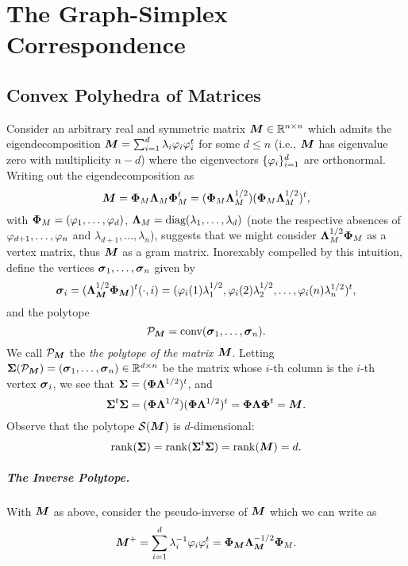 \chapter{The Graph-Simplex Correspondence}



\section{Convex Polyhedra of Matrices}
Consider an arbitrary real and symmetric matrix ${\vb*{M}}\in \mathbb{R}^{n\times n}$ which admits the eigendecomposition ${\vb*{M}}=\sum_{i=1}^d \lambda_i \varphi_i\varphi_i^t$ for some $d\leq n$ (i.e., ${\vb*{M}}$ has eigenvalue zero with multiplicity $n-d$) where the eigenvectors $\{\varphi_i\}_{i=1}^d $ are orthonormal. Writing out the eigendecomposition as 
\[{\vb*{M}}=\boldsymbol{\Phi}_M\vb{\Lambda}_M\boldsymbol{\Phi}_M^t=(\boldsymbol{\Phi}_M\vb{\Lambda}_M^{1/2})(\boldsymbol{\Phi}_M\vb{\Lambda}_M^{1/2})^t,\]
with $\boldsymbol{\Phi}_M = (\varphi_1,\dots,\varphi_d)$, $\vb{\Lambda}_M=\text{diag}(\lambda_1,\dots,\lambda_d)$ (note the respective absences of $\varphi_{d+1},\dots,\varphi_n$ and $\lambda_{d+1},\dots,\lambda_n$), suggests that we might consider $\vb{\Lambda}_M^{1/2}\boldsymbol{\Phi}_M$ as a vertex matrix, thus ${\vb*{M}}$ as a gram matrix. 
Inorexably compelled by this intuition, define the vertices $\vb*{\sigma}_1,\dots,\vb*{\sigma}_n$ given by 
\begin{equation*}
    \vb*{\sigma}_i = (\vb{\Lambda}_{\vb*{M}}^{1/2}\boldsymbol{\Phi}_{\vb*{M}})^t (\cdot,i) = (\varphi_i(1)\lambda_1^{1/2}, \varphi_i(2)\lambda_2^{1/2},\dots,\varphi_i(n)\lambda_n^{1/2})^t,
\end{equation*}
and the polytope 
\begin{equation*}
\mathcal{P}_{\vb*{M}}=\textnormal{conv}(\vb*{\sigma}_1,\dots,\vb*{\sigma}_n).
\end{equation*}
We call $\mathcal{P}_{\vb*{M}}$ the \emph{the polytope of the matrix ${\vb*{M}}$}. 
Letting $\boldsymbol{\Sigma}(\mathcal{P}_{\vb*{M}})=(\vb*{\sigma}_1,\dots,\vb*{\sigma}_n)\in \mathbb{R}^{d\times n}$ be the matrix whose $i$-th column is the $i$-th vertex $\vb*{\sigma}_i$, we see that 
$ \boldsymbol{\Sigma}=(\boldsymbol{\Phi} \vb{\Lambda}^{1/2})^t$, and 
\begin{equation*}
    \boldsymbol{\Sigma}^t \boldsymbol{\Sigma}=(\boldsymbol{\Phi}\vb{\Lambda}^{1/2}) (\boldsymbol{\Phi}\vb{\Lambda}^{1/2})^t = \boldsymbol{\Phi} \vb{\Lambda}\boldsymbol{\Phi}^t ={\vb*{M}}.
\end{equation*}
Observe that the polytope $\mathcal{S}({\vb*{M}})$ is $d$-dimensional: 
\[\rank(\boldsymbol{\Sigma})=\rank(\boldsymbol{\Sigma}^t \boldsymbol{\Sigma})=\rank({\vb*{M}})=d.\]


\paragraph{The Inverse Polytope.}
With ${\vb*{M}}$ as above, consider the pseudo-inverse of ${\vb*{M}}$ which we can write as 
\[{\vb*{M}}^+=\sum_{i=1}^d \lambda_i^{-1} \varphi_i\varphi_i^t = \boldsymbol{\Phi}_{\vb*{M}} \vb{\Lambda}_{\vb*{M}}^{-1/2}\boldsymbol{\Phi}_M.\]


